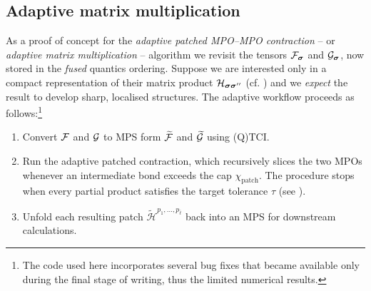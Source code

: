 \subsection{Adaptive matrix multiplication}


As a proof of concept for the \emph{adaptive patched MPO–MPO contraction} -- or \textit{adaptive matrix multiplication} -- algorithm we revisit the tensors \(\mathcal{F}_{\boldsymbol{\sigma}}\) and \(\mathcal{G}_{\boldsymbol{\sigma}}\), now stored in the \emph{fused} quantics ordering.  Suppose we are interested only in a compact representation of
their matrix product $\mathcal H_{\boldsymbol{\sigma}\boldsymbol{\sigma}''}$ (cf. ) and we \emph{expect} the result to develop sharp, localised structures.
The adaptive workflow proceeds as follows:\footnote{The code used here
incorporates several bug fixes that became available only during the final
stage of writing, thus the limited numerical results.}



\begingroup
\renewcommand{\labelenumi}{(\roman{enumi})}
\begin{enumerate}
  \item Convert \(\mathcal{F}\) and \(\mathcal{G}\) to MPS form
        \(\widetilde{\mathcal{F}}\) and \(\widetilde{\mathcal{G}}\) using (Q)TCI.
 \item Run the adaptive patched contraction, which recursively slices the two MPOs whenever an intermediate bond exceeds the cap \(\chi_{\text{patch}}\). The procedure stops when every partial product satisfies the target tolerance $\tau$ (see ).
  \item Unfold each resulting patch
        \(\widetilde{\mathcal H}^{p_{1},\dots,p_{\bar\ell}}\) back into an MPS for downstream calculations.
\end{enumerate} 
\endgroup

